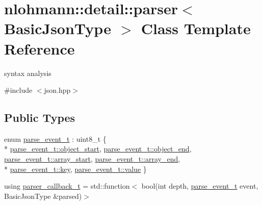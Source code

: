 \hypertarget{classnlohmann_1_1detail_1_1parser}{}\section{nlohmann\+:\+:detail\+:\+:parser$<$ Basic\+Json\+Type $>$ Class Template Reference}
\label{classnlohmann_1_1detail_1_1parser}


syntax analysis  




{\ttfamily \#include $<$json.\+hpp$>$}

\subsection*{Public Types}
\begin{DoxyCompactItemize}
\item 
enum \hyperlink{classnlohmann_1_1detail_1_1parser_a37ac88c864dda495f72cb62776b0bebe}{parse\+\_\+event\+\_\+t} \+: uint8\+\_\+t \{ \\*
\hyperlink{classnlohmann_1_1detail_1_1parser_a37ac88c864dda495f72cb62776b0bebeae73f17027cb0acbb537f29d0a6944b26}{parse\+\_\+event\+\_\+t\+::object\+\_\+start}, 
\hyperlink{classnlohmann_1_1detail_1_1parser_a37ac88c864dda495f72cb62776b0bebeaf63e2a2468a37aa4f394fcc3bcb8249c}{parse\+\_\+event\+\_\+t\+::object\+\_\+end}, 
\hyperlink{classnlohmann_1_1detail_1_1parser_a37ac88c864dda495f72cb62776b0bebeaa4388a3d92419edbb1c6efd4d52461f3}{parse\+\_\+event\+\_\+t\+::array\+\_\+start}, 
\hyperlink{classnlohmann_1_1detail_1_1parser_a37ac88c864dda495f72cb62776b0bebea49642fb732aa2e112188fba1f9d3ef7f}{parse\+\_\+event\+\_\+t\+::array\+\_\+end}, 
\\*
\hyperlink{classnlohmann_1_1detail_1_1parser_a37ac88c864dda495f72cb62776b0bebea3c6e0b8a9c15224a8228b9a98ca1531d}{parse\+\_\+event\+\_\+t\+::key}, 
\hyperlink{classnlohmann_1_1detail_1_1parser_a37ac88c864dda495f72cb62776b0bebea2063c1608d6e0baf80249c42e2be5804}{parse\+\_\+event\+\_\+t\+::value}
 \}
\item 
using \hyperlink{classnlohmann_1_1detail_1_1parser_ad250ad4f2b4af4a497e727c963162ff1}{parser\+\_\+callback\+\_\+t} = std\+::function$<$ bool(int depth, \hyperlink{classnlohmann_1_1detail_1_1parser_a37ac88c864dda495f72cb62776b0bebe}{parse\+\_\+event\+\_\+t} event, Basic\+Json\+Type \&parsed)$>$
\end{DoxyCompactItemize}
